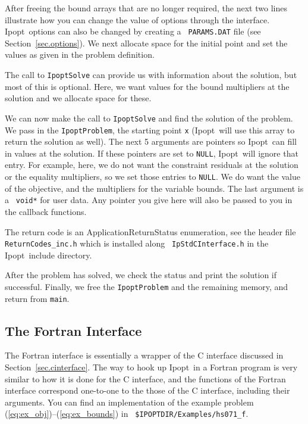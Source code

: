\documentclass[letter,10pt]{article}
\newcommand{\Ipopt}{{\sc Ipopt}}
\begin{document}
After freeing the bound arrays that are no longer required, the next
two lines illustrate how you can change the value of options through
the interface.  \Ipopt\ options can also be changed by creating a {\tt
PARAMS.DAT} file (see Section~\ref{sec.options}). We next allocate
space for the initial point and set the values as given in the problem
definition.

The call to {\tt IpoptSolve} can provide us with information about the
solution, but most of this is optional. Here, we want values for the
bound multipliers at the solution and we allocate space for these.

We can now make the call to {\tt IpoptSolve} and find the solution of
the problem. We pass in the {\tt IpoptProblem}, the starting point
{\tt x} (\Ipopt\ will use this array to return the solution as well).
The next 5 arguments are pointers so \Ipopt\ can fill in values at the
solution.  If these pointers are set to {\tt NULL}, \Ipopt\ will
ignore that entry.  For example, here, we do not want the constraint
residuals at the solution or the equality multipliers, so we set those
entries to {\tt NULL}. We do want the value of the objective, and the
multipliers for the variable bounds. The last argument is a {\tt
  void*} for user data. Any pointer you give here will also be passed
to you in the callback functions.

The return code is an ApplicationReturnStatus enumeration, see the
header file {\tt ReturnCodes\_inc.h} which is installed along {\tt
  IpStdCInterface.h} in the \Ipopt\ include directory.

After the problem has solved, we check the status and print the
solution if successful. Finally, we free the {\tt IpoptProblem} and
the remaining memory, and return from {\tt main}.

\subsection{The Fortran Interface}

The Fortran interface is essentially a wrapper of the C interface
discussed in Section~\ref{sec.cinterface}.  The way to hook up \Ipopt\
in a Fortran program is very similar to how it is done for the C
interface, and the functions of the Fortran interface correspond
one-to-one to the those of the C interface, including their arguments.
You can find an implementation of the example problem
(\ref{eq:ex_obj})--(\ref{eq:ex_bounds}) in {\tt
  \$IPOPTDIR/Examples/hs071\_f}.
\end{document}

